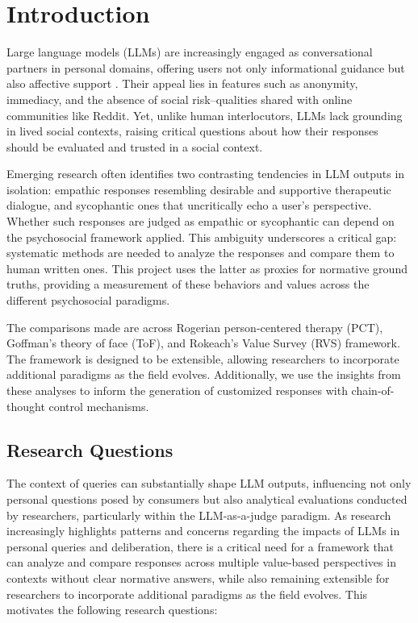 \section{Introduction}
\textcolor{black!80}{Large language models (LLMs) are increasingly engaged as conversational partners in personal domains, offering users not only informational guidance but also affective support \cite{zhang-ai_companions, phang-affective, anthropic2025}. Their appeal lies in features such as anonymity, immediacy, and the absence of social risk--qualities shared with online communities like Reddit. Yet, unlike human interlocutors, LLMs lack grounding in lived social contexts, raising critical questions about how their responses should be evaluated and trusted in a social context.}

\textcolor{black!80}{Emerging research often identifies two contrasting tendencies in LLM outputs in isolation: empathic responses resembling desirable and supportive therapeutic dialogue, and sycophantic ones that uncritically echo a user’s perspective. Whether such responses are judged as empathic or sycophantic can depend on the psychosocial framework applied. This ambiguity underscores a critical gap: systematic methods are needed to analyze the responses and compare them to human written ones. This project uses the latter as proxies for normative ground truths, providing a measurement of these behaviors and values across the different psychosocial paradigms.}

\textcolor{black!80}{The comparisons made are across Rogerian person-centered therapy (PCT), Goffman’s theory of face (ToF), and Rokeach’s Value Survey (RVS) framework. The framework is designed to be extensible, allowing researchers to incorporate additional paradigms as the field evolves. Additionally, we use the insights from these analyses to inform the generation of customized responses with chain-of-thought control mechanisms.}


\subsection{Research Questions}\label{sec:RQs}
The context of queries can substantially shape LLM outputs, influencing not only personal questions posed by consumers but also analytical evaluations conducted by researchers, particularly within the LLM-as-a-judge paradigm. As research increasingly highlights patterns and concerns regarding the impacts of LLMs in personal queries and deliberation, there is a critical need for a framework that can analyze and compare responses across multiple value-based perspectives in contexts without clear normative answers, while also remaining extensible for researchers to incorporate additional paradigms as the field evolves. This motivates the following research questions: 

